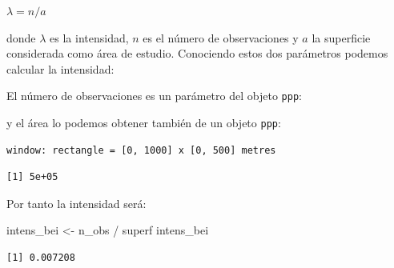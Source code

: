 \documentclass[
  letterpaper,
  DIV=11,
  numbers=noendperiod]{scrreprt}
\newenvironment{Shaded}{\begin{snugshade}}{\end{snugshade}}
\newcommand{\FunctionTok}[1]{\textcolor[rgb]{0.28,0.35,0.67}{#1}}
\newcommand{\NormalTok}[1]{\textcolor[rgb]{0.00,0.23,0.31}{#1}}
\newcommand{\OtherTok}[1]{\textcolor[rgb]{0.00,0.23,0.31}{#1}}
\newcommand{\SpecialCharTok}[1]{\textcolor[rgb]{0.37,0.37,0.37}{#1}}
\begin{document}
\(\lambda = {n}/{a}\)

donde \(\lambda\) es la intensidad, \(n\) es el número de observaciones
y \(a\) la superficie considerada como área de estudio. Conociendo estos
dos parámetros podemos calcular la intensidad:

El número de observaciones es un parámetro del objeto \texttt{ppp}:

\begin{Shaded}
\end{Shaded}

y el área lo podemos obtener también de un objeto \texttt{ppp}:

\begin{Shaded}
\end{Shaded}

\begin{verbatim}
window: rectangle = [0, 1000] x [0, 500] metres
\end{verbatim}

\begin{Shaded}
\end{Shaded}

\begin{verbatim}
[1] 5e+05
\end{verbatim}

Por tanto la intensidad será:

\begin{Shaded}
\begin{Highlighting}[]
\NormalTok{intens\_bei }\OtherTok{\textless{}{-}}\NormalTok{ n\_obs }\SpecialCharTok{/}\NormalTok{ superf}
\NormalTok{intens\_bei}
\end{Highlighting}
\end{Shaded}

\begin{verbatim}
[1] 0.007208
\end{verbatim}
\end{document}
